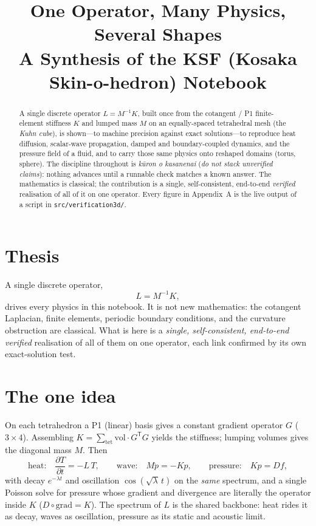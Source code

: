\documentclass[11pt]{article}
\title{\textbf{One Operator, Many Physics, Several Shapes}\\[4pt]
\large A Synthesis of the KSF (Kosaka Skin-o-hedron) Notebook}
\author{}
\date{}
\newcommand{\nofreelunch}{\emph{k\=uron o kasanenai}}
\newcommand{\code}[1]{\texttt{#1}}
\begin{document}
\maketitle

\begin{abstract}
\noindent A single discrete operator $L = M^{-1}K$, built once from the cotangent /
P1 finite-element stiffness $K$ and lumped mass $M$ on an equally-spaced
tetrahedral mesh (the \emph{Kuhn cube}), is shown---to machine precision against
exact solutions---to reproduce heat diffusion, scalar-wave propagation, damped and
boundary-coupled dynamics, and the pressure field of a fluid, and to carry those
same physics onto reshaped domains (torus, sphere). The discipline throughout is
\nofreelunch{} (\emph{do not stack unverified claims}): nothing advances until a
runnable check matches a known answer. The mathematics is classical; the
contribution is a single, self-consistent, end-to-end \emph{verified} realisation
of all of it on one operator. Every figure in Appendix~A is the live output of a
script in \code{src/verification3d/}.
\end{abstract}

\section{Thesis}
A single discrete operator,
\[
  L = M^{-1} K,
\]
drives every physics in this notebook. It is not new mathematics: the cotangent
Laplacian, finite elements, periodic boundary conditions, and the curvature
obstruction are classical. What is here is a \emph{single, self-consistent,
end-to-end verified} realisation of all of them on one operator, each link
confirmed by its own exact-solution test.

\section{The one idea}
On each tetrahedron a P1 (linear) basis gives a constant gradient operator $G$
($3{\times}4$). Assembling $K = \sum_{\text{tet}} \mathrm{vol}\cdot G^{\mathsf T}G$
yields the stiffness; lumping volumes gives the diagonal mass $M$. Then
\[
  \text{heat:}\quad \frac{\partial T}{\partial t} = -L\,T,\qquad
  \text{wave:}\quad M\ddot p = -K p,\qquad
  \text{pressure:}\quad K p = D f,
\]
with decay $e^{-\lambda t}$ and oscillation $\cos(\sqrt{\lambda}\,t)$ on the
\emph{same} spectrum, and a single Poisson solve for pressure whose gradient and
divergence are literally the operator inside $K$ ($D\circ\mathrm{grad}=K$). The
spectrum of $L$ is the shared backbone: heat rides it as decay, waves as
oscillation, pressure as its static and acoustic limit.
\end{document}
